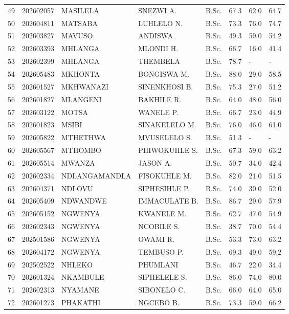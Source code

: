 \documentclass[12pt]{article}
\begin{document}
\begin{longtable}{@{}llllllll@{}}
49 & 202602057 & MASILELA & SNEZWI A. & B.Sc. & 67.3 & 62.0 & 64.7 \\
50 & 202604811 & MATSABA & LUHLELO N. & B.Sc. & 73.3 & 76.0 & 74.7 \\
51 & 202603827 & MAVUSO & ANDISWA & B.Sc. & 49.3 & 59.0 & 54.2 \\
52 & 202603393 & MHLANGA & MLONDI H. & B.Sc. & 66.7 & 16.0 & 41.4 \\
53 & 202602399 & MHLANGA & THEMBELA & B.Sc. & 78.7 & - & - \\
54 & 202605483 & MKHONTA & BONGISWA M. & B.Sc. & 88.0 & 29.0 & 58.5 \\
55 & 202601527 & MKHWANAZI & SINENKHOSI B. & B.Sc. & 75.3 & 27.0 & 51.2 \\
56 & 202601827 & MLANGENI & BAKHILE R. & B.Sc. & 64.0 & 48.0 & 56.0 \\
57 & 202603122 & MOTSA & WANELE P. & B.Sc. & 66.7 & 23.0 & 44.9 \\
58 & 202601823 & MSIBI & SINAKELELO M. & B.Sc. & 76.0 & 46.0 & 61.0 \\
59 & 202605822 & MTHETHWA & MVUSELELO S. & B.Sc. & 51.3 & - & - \\
60 & 202605567 & MTHOMBO & PHIWOKUHLE S. & B.Sc. & 67.3 & 59.0 & 63.2 \\
61 & 202605514 & MWANZA & JASON A. & B.Sc. & 50.7 & 34.0 & 42.4 \\
62 & 202602334 & NDLANGAMANDLA & FISOKUHLE M. & B.Sc. & 82.0 & 21.0 & 51.5 \\
63 & 202604371 & NDLOVU & SIPHESIHLE P. & B.Sc. & 74.0 & 30.0 & 52.0 \\
64 & 202605409 & NDWANDWE & IMMACULATE B. & B.Sc. & 86.7 & 29.0 & 57.9 \\
65 & 202605152 & NGWENYA & KWANELE M. & B.Sc. & 62.7 & 47.0 & 54.9 \\
66 & 202602343 & NGWENYA & NCOBILE S. & B.Sc. & 38.7 & 70.0 & 54.4 \\
67 & 202501586 & NGWENYA & OWAMI R. & B.Sc. & 53.3 & 73.0 & 63.2 \\
68 & 202604172 & NGWENYA & TEMBUSO P. & B.Sc. & 69.3 & 49.0 & 59.2 \\
69 & 202502522 & NHLEKO & PHUMLANI & B.Sc. & 46.7 & 22.0 & 34.4 \\
70 & 202601324 & NKAMBULE & SIPHELELE S. & B.Sc. & 86.0 & 74.0 & 80.0 \\
71 & 202602313 & NYAMANE & SIBONELO C. & B.Sc. & 66.0 & 64.0 & 65.0 \\
72 & 202601273 & PHAKATHI & NGCEBO B. & B.Sc. & 73.3 & 59.0 & 66.2 \\

\end{longtable}
\end{document}
